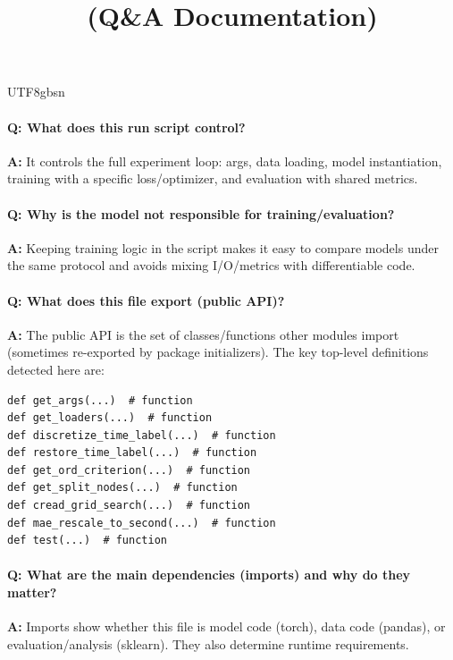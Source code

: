 \documentclass[11pt]{article}
\title{\texttt{\detokenize{run_cread.py}} (Q\&A Documentation)}
\author{}
\date{}
\begin{document}
\begin{CJK*}{UTF8}{gbsn}
\maketitle

\paragraph{Q: What does this run script control?}
\textbf{A:} It controls the full experiment loop: args, data loading, model instantiation, training with a specific loss/optimizer, and evaluation with shared metrics.

\paragraph{Q: Why is the model not responsible for training/evaluation?}
\textbf{A:} Keeping training logic in the script makes it easy to compare models under the same protocol and avoids mixing I/O/metrics with differentiable code.

\paragraph{Q: What does this file export (public API)?}
\textbf{A:} The public API is the set of classes/functions other modules import (sometimes re-exported by package initializers). The key top-level definitions detected here are:

\begin{Verbatim}[fontsize=\small]
def get_args(...)  # function
def get_loaders(...)  # function
def discretize_time_label(...)  # function
def restore_time_label(...)  # function
def get_ord_criterion(...)  # function
def get_split_nodes(...)  # function
def cread_grid_search(...)  # function
def mae_rescale_to_second(...)  # function
def test(...)  # function
\end{Verbatim}

\paragraph{Q: What are the main dependencies (imports) and why do they matter?}
\textbf{A:} Imports show whether this file is model code (torch), data code (pandas), or evaluation/analysis (sklearn). They also determine runtime requirements.

\vspace{1mm}



\end{CJK*}
\end{document}
